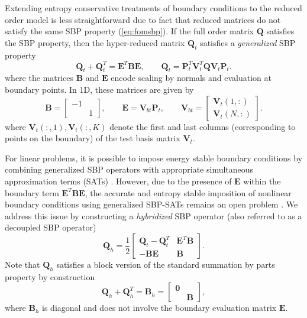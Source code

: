 \documentclass[preprint,10pt]{elsarticle}
\theoremstyle{definition}
\theoremstyle{lemma}
\theoremstyle{theorem}
\theoremstyle{assumption}
\begin{document}
Extending entropy conservative treatments of boundary conditions to the reduced order model is less straightforward due to fact that reduced matrices do not satisfy the same SBP property (\ref{eq:fomsbp}).  If the full order matrix $\bm{Q}$ satisfies the SBP property, then the hyper-reduced matrix $\bm{Q}_t$ satisfies a \textit{generalized} SBP property \cite{fernandez2014generalized} 
\[
\bm{Q}_t + \bm{Q}_t^T = \bm{E}^T\bm{B}\bm{E}, \qquad \bm{Q}_t = \bm{P}_t^T\bm{V}_t^T\bm{Q}\bm{V}_t\bm{P}_t.
\]
where the matrices $\bm{B}$ and $\bm{E}$ encode scaling by normals and evaluation at boundary points.  In 1D, these matrices are given by
\[
\bm{B} = \begin{bmatrix}-1 & \\ & 1\end{bmatrix}, \qquad \bm{E} = \bm{V}_{bt}\bm{P}_t, \qquad \bm{V}_{bt} = \begin{bmatrix}\bm{V}_t(1,:) \\ \bm{V}_t(N,:)\end{bmatrix}.
\]
where $\bm{V}_t(:,1), \bm{V}_t(:,K)$ denote the first and last columns (corresponding to points on the boundary) of the test basis matrix $\bm{V}_t$.  

For linear problems, it is possible to impose energy stable boundary conditions by combining generalized SBP operators with appropriate simultaneous approximation terms (SATs) \cite{fernandez2018simultaneous}.  However, due to the presence of $\bm{E}$ within the boundary term $\bm{E}^T\bm{B}\bm{E}$, the accurate and entropy stable imposition of nonlinear boundary conditions using generalized SBP-SATs remains an open problem \cite{crean2018entropy, chan2018efficient, chenreview}. We address this issue by constructing a \textit{hybridized} SBP operator (also referred to as a decoupled SBP operator) \cite{chan2017discretely, chan2019skew}
\[
\bm{Q}_{h} = \frac{1}{2}\begin{bmatrix}
\bm{Q}_t - \bm{Q}_t^T & \bm{E}^T\bm{B} \\
-\bm{B}\bm{E} & \bm{B}
\end{bmatrix}.
\]
Note that $\bm{Q}_h$ satisfies a block version of the standard summation by parts property by construction
\[
\bm{Q}_h + \bm{Q}_h^T = \bm{B}_h = \begin{bmatrix}
\bm{0} & \\
& \bm{B} \end{bmatrix},  
\]
where $\bm{B}_h$ is diagonal and does not involve the boundary evaluation matrix $\bm{E}$.  
\end{document}
